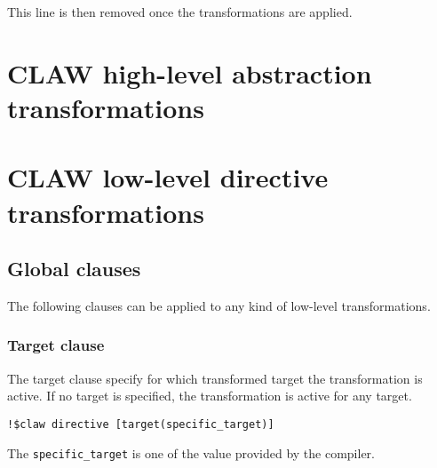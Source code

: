 \documentclass{article}
\begin{document}
This line is then removed once the transformations are applied. 

\section{CLAW high-level abstraction transformations}


\section{CLAW low-level directive transformations}

\subsection{Global clauses}
The following clauses can be applied to any kind of low-level transformations.

\subsubsection{Target clause}
The target clause specify for which transformed target the transformation is active. If no target is specified, the transformation is active for any target.

\begin{lstlisting}
!$claw directive [target(specific_target)]
\end{lstlisting}

The \lstinline|specific_target| is one of the value provided by the compiler.






\appendix

\end{document}
